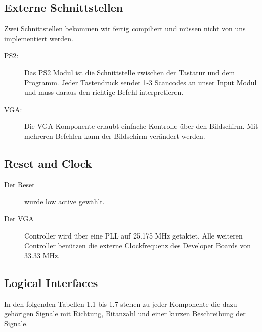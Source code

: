 \subsection{Externe Schnittstellen}
Zwei Schnittstellen bekommen wir fertig compiliert und müssen nicht von uns implementiert werden.
\begin{description}
 \item[PS2:] Das PS2 Modul ist die Schnittstelle zwischen der Tastatur und dem Programm. Jeder Tastendruck sendet 1-3 
Scancodes an unser Input Modul und muss daraus den richtige Befehl interpretieren.
 \item[VGA:] Die VGA Komponente erlaubt einfache Kontrolle über den Bildschirm. Mit mehreren Befehlen kann der Bildschirm
verändert werden.
 \end{description}

\subsection{Reset and Clock}
\begin{description}
\item[Der Reset] wurde low active gewählt.

\item[Der VGA] Controller wird über eine PLL auf 25.175 MHz getaktet. 
Alle weiteren Controller benützen die externe Clockfrequenz
des Developer Boards von 33.33 MHz.
 \end{description}


\subsection{Logical Interfaces}


In den folgenden Tabellen 1.1 bis 1.7 stehen zu jeder Komponente die dazu gehörigen
Signale mit Richtung, Bitanzahl und einer kurzen Beschreibung der Signale. 

